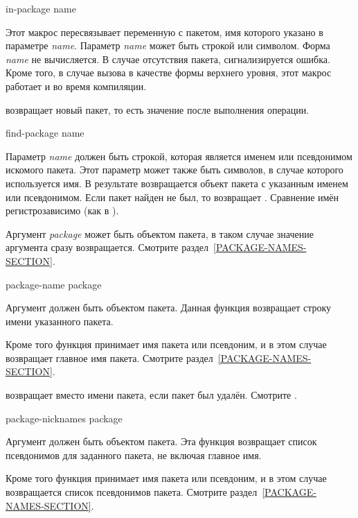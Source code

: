 \begin{defmac}
in-package name

Этот макрос пересвязывает переменную  с пакетом, имя которого
указано в параметре \emph{name}. Параметр \emph{name} может быть строкой или
символом. Форма \emph{name} не вычисляется.
В случае отсутствия пакета, сигнализируется ошибка.
Кроме того, в случае вызова в качестве формы верхнего уровня, этот макрос
работает и во время компиляции.

 возвращает новый пакет, то есть значение  после
выполнения операции.
\end{defmac}

\begin{defun}[Функция]
find-package name

Параметр \emph{name} должен быть строкой, которая является именем или
псевдонимом искомого пакета. Этот параметр может также быть символов, в случае
которого используется имя. В результате возвращается объект пакета с
указанным именем или псевдонимом. Если пакет найден не был, то
 возвращает {\false}.
Сравнение имён регистрозависимо (как в ).

Аргумент \emph{package} может быть объектом пакета, в таком случае значение
аргумента сразу возвращается. Смотрите раздел~\ref{PACKAGE-NAMES-SECTION}.
\end{defun}

\begin{defun}[Функция]
package-name package

Аргумент должен быть объектом пакета. Данная функция возвращает строку имени
указанного пакета.

Кроме того функция принимает имя пакета или псевдоним, и в этом случае
возвращает главное имя пакета. Смотрите раздел~\ref{PACKAGE-NAMES-SECTION}.

 возвращает  вместо имени пакета, если пакет был
удалён. Смотрите .
\end{defun}

\begin{defun}[Функция]
package-nicknames package

Аргумент должен быть объектом пакета. Эта функция возвращает список псевдонимов
для заданного пакета, не включая главное имя.

Кроме того функция принимает имя пакета или псевдоним, и в этом случае
возвращается список псевдонимов пакета. Смотрите раздел~\ref{PACKAGE-NAMES-SECTION}.
\end{defun}


